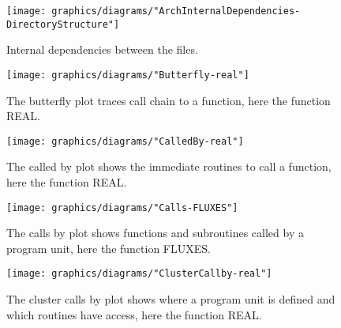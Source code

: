 \documentclass[11pt, oneside]{article}   	%
\begin{document}
\begin{figure}[htbp] %
   \centering
   \texttt{[image: graphics/diagrams/"ArchInternalDependencies-DirectoryStructure"]} 
   \caption{Internal dependencies between the files.}
   \label{fig:ArchInternalDependencies-DirectoryStructure}
\end{figure}

\begin{figure}[htbp] %
   \centering
   \texttt{[image: graphics/diagrams/"Butterfly-real"]} 
   \caption{The butterfly plot traces call chain to a function, here the function REAL.}
   \label{fig:Butterfly-real}
\end{figure}

\begin{figure}[htbp] %
   \centering
   \texttt{[image: graphics/diagrams/"CalledBy-real"]} 
   \caption{The called by plot shows the immediate routines to call a function, here the function REAL.}
   \label{fig:CalledBy-real}
\end{figure}

\begin{figure}[htbp] %
   \centering
   \texttt{[image: graphics/diagrams/"Calls-FLUXES"]} 
   \caption{The calls by plot shows functions and subroutines called by a program unit, here the function FLUXES.}
   \label{fig:Calls-FLUXES}
\end{figure}

\begin{figure}[htbp] %
   \centering
   \texttt{[image: graphics/diagrams/"ClusterCallby-real"]} 
   \caption{The cluster calls by plot shows where a program unit is defined and which routines have access, here the function REAL.}
   \label{fig:ClusterCallby-real}
\end{figure}

\end{document}
